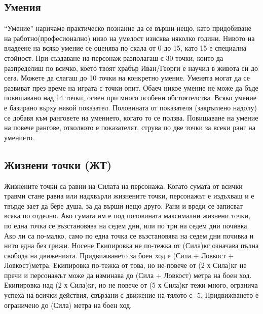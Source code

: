 \subsection{Умения}
“Умение” наричаме практическо познание да се върши нещо, като придобиване на работно(професионално) ниво на умелост изисква няколко години. Нивото на владеене на всяко умение се оценява по скала от 0 до 15, като 15 е специална стойност.
При създаване на персонаж разполагаш с 30 точки, които да разпределиш по всичко, което твоят храбър Иван/Георги е научил в живота си до сега. Можете да слагаш до 10 точки на конкретно умение.
Умеията могат да се развиват през време на играта с точки опит. Обаеч никое умение не може да бъде повишавано над 14 точки, освен при много особени обстоятелства.
Всяко умение е базирано върху някой показател. Половината от показателя (закръглено надолу) се добавя към ранговете на умението, когато то се ползва. Повишаване на умение на повече рангове,  отколкото е показателят, струва по две точки за всеки ранг на умението.

\subsection{Жизнени точки (ЖТ)}
Жизнените точки са равни на Силата на персонажа. Когато сумата от всички травми стане равна или надхвърли жизнените точки, персонажът е издъхващ и е твърде зает да бере душа, за да върши нещо друго. 
Рани и вреди се записват всяка по отделно. Ако сумата им е под половината максимални жизнени точки, по една точка се възстановява на седем дни, или по три на седем дни почивка. Ако ли са по-малко, само по една точка се възстановява на седем дни почивка и нито една без грижи.
Носене
Екипировка не по-тежка от (Сила)кг означава пълна свобода на движенията. Придвижването за боен ход е (Сила + Ловкост + Ловкост)метра.
Екипировка по-тежка от това, но не-повече от (2 х Сила)кг не пречи и персонажът може да изминава до (Сила + Ловкост) метра на боен ход.
Екипировка над (2 х Сила)кг, но не повече от (5 х Сила)кг тежи много, огранича успеха на всички действия, свързани с движение на тялото с -5. Придвижването е ограничено до (Сила) метра на боен ход.
